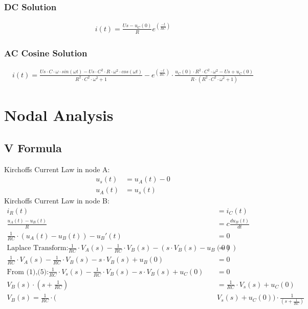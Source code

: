 \documentclass{article}
\begin{document}
\subsubsection{DC Solution}
\begin{align*}
   i(t) = \frac{Us-u_C(0)}{R} e^(\frac{-t}{RC})
\end{align*}
\subsubsection{AC Cosine Solution}
\begin{align*}
   i(t) = \frac{Us\cdot C\cdot \omega \cdot sin(\omega t)-Us\cdot C^2\cdot R \cdot \omega^2 \cdot cos(\omega t)}{R^2\cdot C^2 \cdot \omega ^2 +1}-e^(\frac{-t}{RC})\cdot\frac{u_C(0)\cdot R^2\cdot C^2 \cdot \omega ^2-Us+u_C(0)}{R\cdot (R^2\cdot C^2 \cdot \omega ^2 +1)}
\end{align*}
\section{Nodal Analysis}
\subsection{V Formula}
Kirchoffs Current Law in node A:
\begin{align}
       u_s(t) &= u_A(t) - 0 \nonumber \\
       u_A(t) &= u_s(t)     \label{eq2}
\end{align}
Kirchoffs Current Law in node B:
\begin{align*}
    i_R(t)&=i_C(t) \\
    \frac{u_A(t)-u_B(t)}{R} &= c \frac{du_B(t)}{dt}\\  
    \frac{1}{RC}\cdot (u_A(t)-u_B(t)) - u_B'(t)&=0\\
    \text{Laplace Transform:} \frac{1}{RC}\cdot V_A(s) - \frac{1}{RC}\cdot V_B(s) -(s\cdot V_B(s) -u_B(0)) &= 0\\
    \frac{1}{RC}\cdot V_A(s) - \frac{1}{RC}\cdot V_B(s) -s\cdot V_B(s) +u_B(0) &= 0\\
    \text{From (1),(5):}
    \frac{1}{RC}\cdot V_s(s) - \frac{1}{RC}\cdot V_B(s) -s\cdot V_B(s) +u_C(0) &= 0\\
    V_B(s)\cdot(s+\frac{1}{RC}) &= \frac{1}{RC}\cdot V_s(s) + u_C(0)\\
    V_B(s) = \frac{1}{RC}\cdot (&V_s(s) + u_C(0))\cdot \frac{1}{(s+\frac{1}{RC})}
\end{align*}
\end{document}
